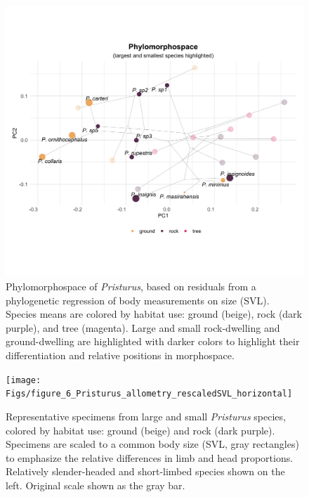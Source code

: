 \documentclass[
  11pt,
]{article}
\begin{document}
\newpage

\begin{figure}

{\centering \includegraphics[width=1\linewidth]{Figs/figure_5_phylomorphospace_large_small} 

}

\caption{Phylomorphospace of \textit{Pristurus}, based on residuals from a phylogenetic regression of body measurements on size (SVL). Species means are colored by habitat use: ground (beige), rock (dark purple), and tree (magenta). Large and small rock-dwelling and ground-dwelling are highlighted with darker colors to highlight their differentiation and relative positions in morphospace.}\label{fig:unnamed-chunk-8}
\end{figure}

\newpage

\begin{figure}

{\centering \texttt{[image: Figs/figure\_6\_Pristurus\_allometry\_rescaledSVL\_horizontal]} 

}

\caption{Representative specimens from large and small \textit{Pristurus} species, colored by habitat use: ground (beige) and rock (dark purple). Specimens are scaled to a common body size (SVL, gray rectangles) to emphasize the relative differences in limb and head proportions. Relatively slender-headed and short-limbed species shown on the left. Original scale shown as the gray bar.}\label{fig:unnamed-chunk-9}
\end{figure}
\end{document}
